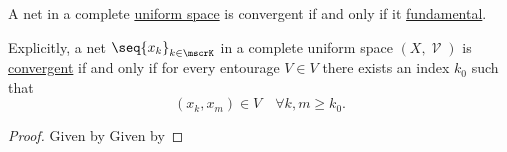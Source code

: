 \begin{theorem}\label{thm:cauchys_net_convergence_criterion}
  A net in a complete \hyperref[def:complete_uniform_space]{uniform space} is convergent if and only if it \hyperref[def:fundamental_net]{fundamental}.

  Explicitly, a net \( \seq{ x_k }_{k \in \mscrK} \) in a complete uniform space \( (X, \mscrV) \) is \hyperref[def:net_convergence/limit]{convergent} if and only if for every entourage \( V \in V \) there exists an index \( k_0 \) such that
  \begin{equation*}
    (x_k, x_m) \in V \quad\forall k, m \geq k_0.
  \end{equation*}
\end{theorem}
\begin{proof}
  \SufficiencySubProof Given by 
  \NecessitySubProof Given by 
\end{proof}
